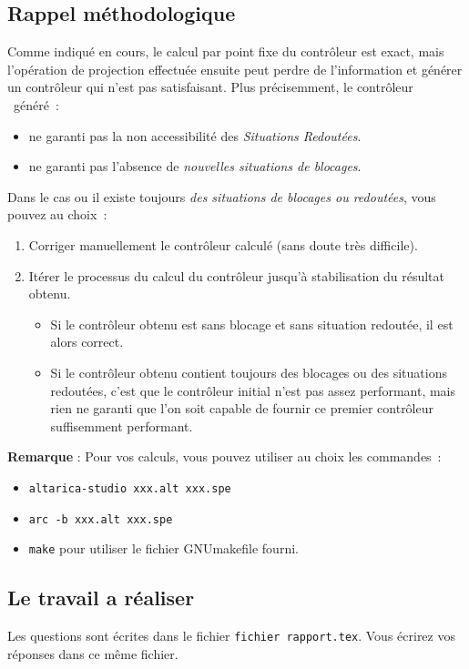 \subsection{Rappel méthodologique}
Comme indiqué en cours, le calcul par point fixe du contrôleur est exact, mais l'opération de projection effectuée ensuite peut perdre de l'information et générer un contrôleur qui n'est pas satisfaisant. Plus précisemment, le contrôleur \altarica\ généré~:
\begin{itemize}
\item ne garanti pas la non accessibilité des \emph{Situations Redoutées}.
\item ne garanti pas l'absence de \emph{nouvelles situations de blocages}.
\end{itemize}

Dans le cas ou il existe toujours \emph{des situations de blocages ou redoutées}, vous pouvez au choix~:
\begin{enumerate}
\item Corriger manuellement le contrôleur calculé (sans doute très difficile).
\item Itérer le processus du calcul du contrôleur jusqu'à stabilisation du résultat obtenu. 
  \begin{itemize}
  \item Si le contrôleur obtenu est sans blocage et sans situation redoutée, il est alors correct.
  \item Si le contrôleur obtenu contient toujours des blocages ou des situations redoutées, c'est que le contrôleur initial n'est pas assez performant, mais rien ne garanti que l'on soit capable de fournir ce premier contrôleur suffisemment performant.
  \end{itemize}
\end{enumerate}

{\bf Remarque} : Pour vos calculs, vous pouvez utiliser au choix les commandes~:
\begin{itemize}
\item {\tt altarica-studio xxx.alt xxx.spe}
\item {\tt arc -b xxx.alt xxx.spe}
\item {\tt make} pour utiliser le fichier GNUmakefile fourni.
\end{itemize}

\subsection{Le travail a réaliser}
Les questions sont écrites dans le fichier {\tt fichier rapport.tex}. Vous écrirez vos réponses dans ce même fichier.

